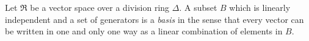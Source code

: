 Let $\Re$ be a vector space over a division ring $\Delta$. A subset $B$ which is linearly independent and a set of generators is a \textit{basis} in the sense that every vector can be written in one and only one way as a linear combination of elements in $B$.
